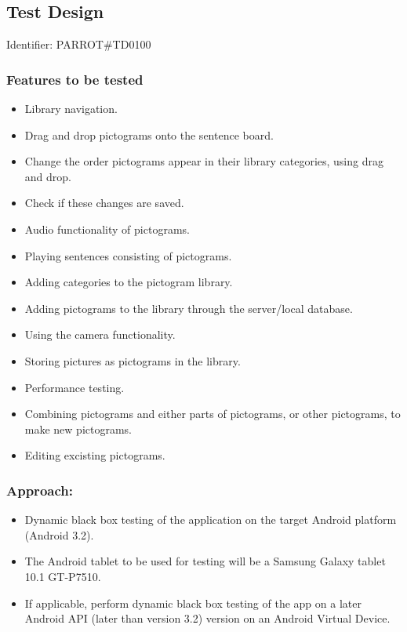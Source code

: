
\subsection{Test Design}

Identifier: PARROT\#TD0100

\subsubsection*{Features to be tested}
\begin{itemize}
	\item Library navigation.
	\item Drag and drop pictograms onto the sentence board.
	\item Change the order pictograms appear in their library categories, using drag and drop.
	\item Check if these changes are saved.
	\item Audio functionality of pictograms.
	\item Playing sentences consisting of pictograms.
	\item Adding categories to the pictogram library.
	\item Adding pictograms to the library through the server/local database.
	\item Using the camera functionality.
	\item Storing pictures as pictograms in the library.
	\item Performance testing.
	\item Combining pictograms and either parts of pictograms, or other pictograms, to make new pictograms.
	\item Editing excisting pictograms.
\end{itemize}

\subsubsection*{Approach:}
\begin{itemize}
	\item Dynamic black box testing of the application on the target Android platform (Android 3.2).
	\item The Android tablet to be used for testing will be a Samsung Galaxy tablet 10.1 GT-P7510.
	\item If applicable, perform dynamic black box testing of the app on a later Android API (later than version 3.2) version on an  Android Virtual Device.
\end{itemize}

